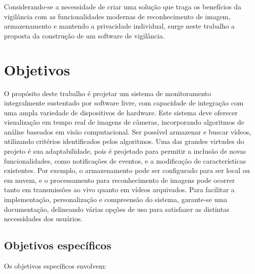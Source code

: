 \documentclass[12pt, %
openright, 
oneside, %
a4paper,    %
brazil]{facom-ufu-abntex2}
\begin{document}
Considerando-se a necessidade de criar uma solução que traga os benefícios da
vigilância com as funcionalidades modernas de reconhecimento de imagem,
armazenamento e mantendo a privacidade individual, surge neste trabalho a
proposta da construção de um software de vigilância.

\section{Objetivos}

O propósito deste trabalho é projetar um sistema de monitoramento integralmente
sustentado por software livre, com capacidade de integração com uma ampla
variedade de dispositivos de hardware. Este sistema deve oferecer visualização em
tempo real de imagens de câmeras, incorporando algoritmos de análise baseados
em visão computacional. Ser possível armazenar e buscar vídeos, utilizando
critérios identificados pelos algoritmos. Uma das grandes virtudes do projeto é
sua adaptabilidade, pois é projetado para permitir a inclusão de novas
funcionalidades, como notificações de eventos, e a modificação de
características existentes. Por exemplo, o armazenamento pode ser configurado
para ser local ou em nuvem, e o processamento para reconhecimento de imagens
pode ocorrer tanto em transmissões ao vivo quanto em vídeos arquivados. Para
facilitar a implementação, personalização e compreensão do sistema, garante-se uma 
documentação, delineando várias opções de uso para satisfazer as
distintas necessidades dos usuários.

\subsection{Objetivos específicos}

Os objetivos específicos envolvem:
\end{document}
